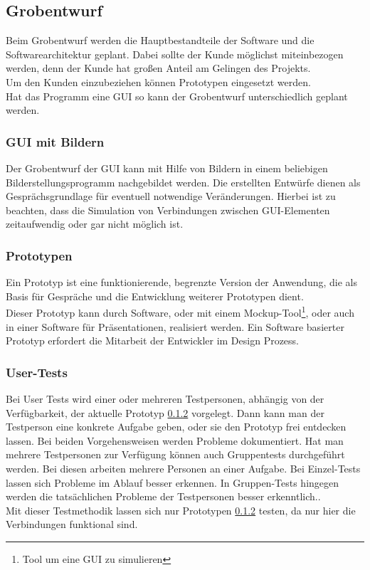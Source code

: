 \documentclass[12pt,a4paper]{article}
\begin{document}
\subsection{Grobentwurf}
Beim Grobentwurf werden die Hauptbestandteile der Software und die Softwarearchitektur geplant. Dabei sollte der Kunde möglichst miteinbezogen werden, denn der Kunde hat großen Anteil am Gelingen des Projekts\cite{10.1145/1060710.1060712}. \\
Um den Kunden einzubeziehen können Prototypen eingesetzt werden.\\
Hat das Programm eine \ac{GUI} so kann der Grobentwurf unterschiedlich geplant werden. \\
\subsubsection{GUI mit Bildern}
\label{GUI mit Bildern}
Der Grobentwurf der \ac{GUI} kann mit Hilfe von Bildern in einem beliebigen Bilderstellungsprogramm nachgebildet werden. Die erstellten Entwürfe dienen als Gesprächsgrundlage für eventuell notwendige Veränderungen. Hierbei ist zu beachten, dass die Simulation von Verbindungen zwischen \ac{GUI}-Elementen zeitaufwendig oder gar nicht möglich ist.
\subsubsection{Prototypen}
\label{Prototypen}
Ein Prototyp ist eine funktionierende, begrenzte Version der Anwendung, die als Basis für Gespräche und die Entwicklung weiterer Prototypen dient\cite{budde1992prototyping}. \\
Dieser Prototyp kann durch Software, oder mit einem Mockup-Tool\footnote{Tool um eine \ac{GUI} zu simulieren}, oder auch in einer Software für Präsentationen, realisiert werden. Ein Software basierter Prototyp erfordert die Mitarbeit der Entwickler im Design Prozess. 
\subsubsection{User-Tests}
\label{User-Tests}
Bei User Tests wird einer oder mehreren Testpersonen, abhängig von der Verfügbarkeit, der aktuelle Prototyp \ref{Prototypen} vorgelegt. Dann kann man der Testperson eine konkrete Aufgabe geben, oder sie den Prototyp frei entdecken lassen. Bei beiden Vorgehensweisen werden Probleme dokumentiert. Hat man mehrere Testpersonen zur Verfügung können auch Gruppentests durchgeführt werden. Bei diesen arbeiten mehrere Personen an einer Aufgabe. Bei Einzel-Tests lassen sich Probleme im Ablauf besser erkennen. In Gruppen-Tests hingegen werden die tatsächlichen Probleme der Testpersonen besser erkenntlich.\cite{BASTIEN2010e18}. \\
Mit dieser Testmethodik lassen sich nur Prototypen \ref{Prototypen} testen, da nur hier die Verbindungen funktional sind.
\end{document}

